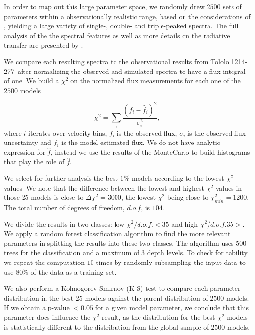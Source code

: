 \documentclass[a4,useAMS,usenatbib,usegraphicx]{mn2e}
\newcommand{\tol}{Tololo 1214-277}
\begin{document}
In order to map out this large parameter space, we randomly drew
$2500$ sets of parameters within a observationally realistic range,
based on the considerations of \citet{Laursen2013ApJ...766..124L}, 
yielding a large variety of single-, double- and triple-peaked
spectra. 
The full analysis of the the spectral features as well as
more details on the radiative transfer are presented by
\citet{Gronke2016}.    

We compare each resulting spectra to the observational results from
\tol\ after normalizing the observed and simulated spectra to have a 
flux integral of one.
We build a $\chi^2$ on the normalized flux measurements for each one
of the $2500$ models

\begin{equation}
\chi^2 = \sum_{i} \frac{({f}_i - \hat{f}_i)^2}{\sigma_i^2}, 
\label{eq:chi2}
\end{equation}
%
where $i$ iterates over velocity bins, $f_{i}$ is the observed flux,
$\sigma_i$ is the observed flux uncertainty and $\hat{f}_i$ is the
model estimated flux.
We do not have analytic expression for $\hat{f}$, instead we use the
results of the MonteCarlo to build histograms that play the role of
$\hat{f}$.   

We select for further analysis the best $1\%$ models according to the
lowest $\chi^2$ values.
We note that the difference between the lowest and highest $\chi^2$ values in
those $25$ models is close to $\Delta\chi^2 = 3000$, the lowest
$\chi^2$ being close to $\chi^2_{min}=1200$. 
The total number of degrees of freedom, $d.o.f$, is $104$. 

We divide the results in two classes: low $\chi^2/d.o.f.<35$ and high
$\chi^2/d.o.f.35>$.
We apply a random forest classification algorithm to find the
more relevant parameters in splitting the results into these two
classes. 
The algorithm uses $500$ trees for the classification and a
maximum of $3$ depth levels. 
To check for tability we repeat the computation $10$ times by
randomly subsampling the input data to use $80\%$ of the data as a
training set.

We also perform a Kolmogorov-Smirnov (K-S) test to compare each parameter
distribution in the best $25$ models against the parent distribution
of $2500$ models. 
If we obtain a p-value $<0.05$ for a given model parameter, we conclude that
this parameter does influence the $\chi^2$ result, as the distribution for
the best $\chi^2$ models is statistically different to the
distribution from the global sample of $2500$ models.  
\end{document}
